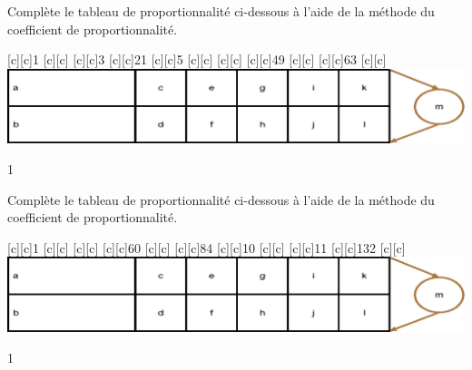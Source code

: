 \documentclass[a4paper,11pt]{report}
\begin{document}
\begin{exop}{
Complète le tableau de proportionnalité ci-dessous à l'aide de la méthode du coefficient de proportionnalité.
 

\vspace{-0.8cm}
\begin{center}
[c][c]{1}
[c][c]{}
[c][c]{3}
[c][c]{21}
[c][c]{5}
[c][c]{}
[c][c]{}
[c][c]{49}
[c][c]{}
[c][c]{63}
[c][c]{\Large\color{brown}{$\cdot \qquad$}}
\includegraphics[scale=.9]{media/fa-30/tableaucoeffn.eps}
\end{center}
\vspace{-0.5cm}}{1}
\end{exop}

\begin{exop}{
Complète le tableau de proportionnalité ci-dessous à l'aide de la méthode du coefficient de proportionnalité.
 
	\vspace{-0.8cm}
\begin{center}
[c][c]{1}
[c][c]{}
[c][c]{}
[c][c]{60}
[c][c]{}
[c][c]{84}
[c][c]{10}
[c][c]{}
[c][c]{11}
[c][c]{132}
[c][c]{\Large\color{brown}{$\cdot \qquad$}}
\includegraphics[scale=.9]{media/fa-30/tableaucoeffn.eps}
\end{center}
\vspace{-0.5cm}}{1}
\end{exop}
\end{document}
